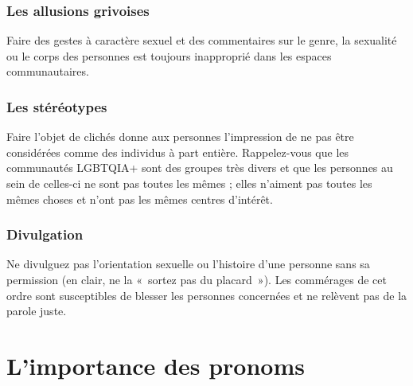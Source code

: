 \documentclass[12pt,openany]{book}
\begin{document}
\subsubsection*{Les allusions grivoises}

\noindent Faire des gestes à caractère sexuel et des commentaires sur le genre, la sexualité ou le corps des personnes est toujours inapproprié dans les espaces communautaires.

\subsubsection*{Les stéréotypes}

\noindent Faire l’objet de clichés donne aux personnes l’impression de ne pas être considérées comme des individus à part entière. Rappelez-vous que les communautés \mbox{LGBTQIA+} sont des groupes très divers et que les personnes au sein de celles-ci ne sont pas toutes les mêmes ;
elles n’aiment pas toutes les mêmes choses et n’ont pas les mêmes centres d’intérêt.

\subsubsection*{Divulgation}

\noindent Ne divulguez pas l’orientation sexuelle ou l’histoire d’une personne sans sa permission (en clair, ne la \mbox{« s}ortez pas du placar\mbox{d »}). Les commérages de cet ordre sont susceptibles de blesser les personnes concernées et ne relèvent pas de la parole juste.

\begin{figure}[h]
    \centering
\end{figure}

\section*{L’importance des pronoms}
\end{document}

